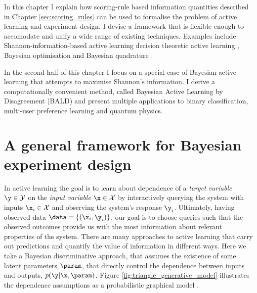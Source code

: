In this chapter I explain how scoring-rule based information quantities described in Chapter \ref{sec:scoring_rules} can be used to formalise the problem of active learning and experiment design. I devise a framework that is flexible enough to accomodate and unify a wide range of existing techniques. Examples include Shannon-information-based active learning \citep{Krause2006,MacKay1992,Houlsby2011} decision theoretic active learning \citep{Kapoor2007,Zhu2003active}, Bayesian optimisation \citep{Hennig2012entropy,Hennig2012newton} and Bayesian quadrature \citep{BZHermiteQuadrature,BZMonteCarlo}.

In the second half of this chapter I focus on a special case of Bayesian active learning that attempts to maximise Shannon's information. I derive a computationally convenient method, called Bayesian Active Learning by Disagreement (BALD) and present multiple applications to binary classification, multi-user preference learning and quantum physics.

                                                      
\section{A general framework for Bayesian experiment design}

In active learning the goal is to learn about dependence of a \emph{target variable} $\y\in\mathcal{Y}$ on the \emph{input variable} $\x\in\mathcal{X}$ by interactively querying the system with inputs $\x_i\in\mathcal{X}$ and observing the system's response $\y_i$. Ultimately, having observed data $\data = \{(\x_i,\y_i)\}$, our goal is to choose queries such that the observed outcomes provide us with the most information about relevant properties of the system. There are many approaches to active learning that carry out predictions and quantify the value of information in different ways. Here we take a Bayesian discriminative approach, that assumes the existence of some latent parameters $\param$, that directly control the dependence between inputs and outputs, $p(\y\vert\x,\param)$. Figure \ref{fig:triangle_generative_model} illustrates the dependence assumptions as a probabilistic graphical model \citep{Koller2009book}.

